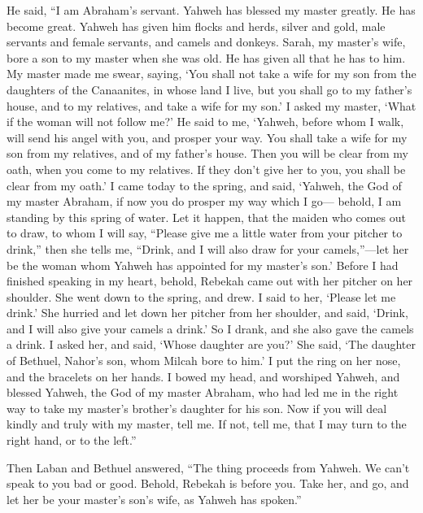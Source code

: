  He said, ``I am Abraham's servant.  Yahweh
has blessed my master greatly. He has become great. Yahweh has given him
flocks and herds, silver and gold, male servants and female servants,
and camels and donkeys.  Sarah, my master's wife, bore a
son to my master when she was old. He has given all that he has to him.
 My master made me swear, saying, `You shall not take a
wife for my son from the daughters of the Canaanites, in whose land I
live,  but you shall go to my father's house, and to my
relatives, and take a wife for my son.'  I asked my master,
`What if the woman will not follow me?'  He said to me,
`Yahweh, before whom I walk, will send his angel with you, and prosper
your way. You shall take a wife for my son from my relatives, and of my
father's house.  Then you will be clear from my oath, when
you come to my relatives. If they don't give her to you, you shall be
clear from my oath.'  I came today to the spring, and said,
`Yahweh, the God of my master Abraham, if now you do prosper my way
which I go---  behold, I am standing by this spring of
water. Let it happen, that the maiden who comes out to draw, to whom I
will say, ``Please give me a little water from your pitcher to drink,''
 then she tells me, ``Drink, and I will also draw for your
camels,''---let her be the woman whom Yahweh has appointed for my
master's son.'  Before I had finished speaking in my heart,
behold, Rebekah came out with her pitcher on her shoulder. She went down
to the spring, and drew. I said to her, `Please let me drink.'
 She hurried and let down her pitcher from her shoulder,
and said, `Drink, and I will also give your camels a drink.' So I drank,
and she also gave the camels a drink.  I asked her, and
said, `Whose daughter are you?' She said, `The daughter of Bethuel,
Nahor's son, whom Milcah bore to him.' I put the ring on her nose, and
the bracelets on her hands.  I bowed my head, and worshiped
Yahweh, and blessed Yahweh, the God of my master Abraham, who had led me
in the right way to take my master's brother's daughter for his son.
 Now if you will deal kindly and truly with my master, tell
me. If not, tell me, that I may turn to the right hand, or to the
left.''

 Then Laban and Bethuel answered, ``The thing proceeds from
Yahweh. We can't speak to you bad or good.  Behold, Rebekah
is before you. Take her, and go, and let her be your master's son's
wife, as Yahweh has spoken.''


